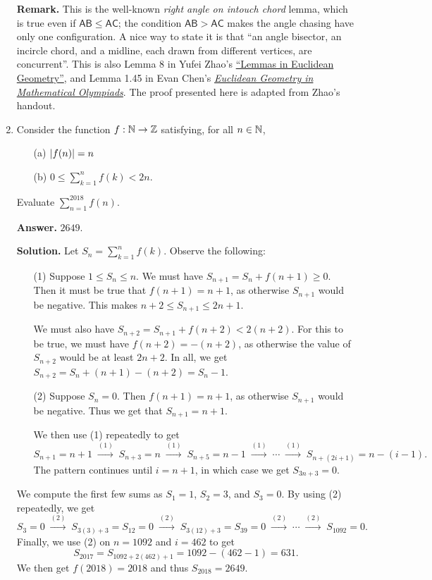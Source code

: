\documentclass[11pt,paper=letter]{scrartcl}
\begin{document}
\begin{enumerate}[left=0pt]
{\small \sffamily \textbf{Remark.} This is the well-known \emph{right angle on intouch chord} lemma, which is true even if $\mathsf{AB \leq AC}$; the condition $\mathsf{AB > AC}$ makes the angle chasing have only one configuration. A nice way to state it is that ``an angle bisector, an incircle chord, and a midline, each drawn from different vertices, are concurrent''. This is also Lemma 8 in Yufei Zhao's \href{http://yufeizhao.com/olympiad/geolemmas.pdf}{``Lemmas in Euclidean Geometry''}, and Lemma 1.45 in Evan Chen's \href{https://books.google.com.ph/books?id=47UaDAAAQBAJ&lpg=PP1&pg=PP1&redir_esc=y#v=onepage&q&f=false}{\emph{Euclidean Geometry in Mathematical Olympiads}}. The proof presented here is adapted from Zhao's handout.}

\item Consider the function $f : \mathbb N \to \mathbb Z$ satisfying, for all $n \in \mathbb N$,

\begin{enumerate}
  \item[(a)] $\left\lvert f(n) \right\rvert = n$
  \item[(b)] $\displaystyle 0 \leq \sum_{k=1}^n f(k) < 2n$.
\end{enumerate}

Evaluate $\displaystyle \sum_{n=1}^{2018}f(n)$.

{\sffamily \bfseries Answer.} $\boxed{2649}$.

{\sffamily \bfseries Solution.} Let $\displaystyle S_n = \sum_{k=1}^{n}f(k)$. Observe the following:
\begin{enumerate}
  \item[(1)] Suppose $1 \leq S_n \leq n$. We must have $S_{n+1} = S_n + f(n+1) \geq 0$. Then it must be true that $f(n+1) = n+1$, as otherwise $S_{n+1}$ would be negative. This makes $n + 2 \leq S_{n+1} \leq 2n + 1$.

  We must also have $S_{n+2} = S_{n+1} + f(n+2) < 2(n+2)$. For this to be true, we must have $f(n+2) = -(n+2)$, as otherwise the value of $S_{n+2}$ would be at least $2n+2$. In all, we get $S_{n+2} = S_n + (n+1) - (n+2) = S_n - 1$.

  \item[(2)] Suppose $S_n = 0$. Then $f(n+1) = n+1$, as otherwise $S_{n+1}$ would be negative. Thus we get that $S_{n+1} = n+1$.

  We then use (1) repeatedly to get $$S_{n+1} = n+1 \;\overset{(1)}{\longrightarrow}\; S_{n+3} = n \;\overset{(1)}{\longrightarrow}\; S_{n+5} = n - 1 \;\overset{(1)}{\longrightarrow}\; \cdots \;\overset{(1)}{\longrightarrow}\; S_{n+(2i+1)} = n - (i-1).$$
  The pattern continues until $i = n+1$, in which case we get $S_{3n+3} = 0$. 
\end{enumerate}
We compute the first few sums as $S_1 = 1$, $S_2 = 3$, and $S_3 = 0$. By using (2) repeatedly, we get
$$S_3 = 0 \;\overset{(2)}{\longrightarrow}\; S_{3(3) + 3} = S_{12} = 0 \;\overset{(2)}{\longrightarrow}\; S_{3(12) + 3} = S_{39} = 0 \;\overset{(2)}{\longrightarrow}\; \cdots \;\overset{(2)}{\longrightarrow}\; S_{1092} = 0.$$
Finally, we use (2) on $n = 1092$ and $i = 462$ to get $$S_{2017} = S_{1092 + 2(462) + 1} = 1092 - (462 - 1) = 631.$$We then get $f(2018) = 2018$ and thus $S_{2018} = 2649$.


\end{enumerate}
\end{document}
